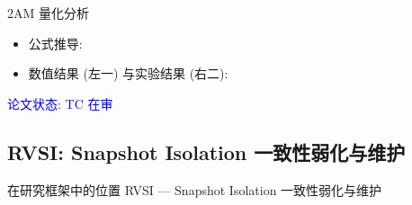 \begin{frame}{2AM 量化分析}
  \begin{itemize}
    \item 公式推导:
      \begin{figure}[h]
        \centering
        \qquad
      \end{figure}
    \item 数值结果 (左一) 与实验结果 (右二): \begin{figure}[h]
        \centering
        \quad
      \end{figure}
  \end{itemize}
  \begin{center}
    \textcolor{blue}{论文状态: TC 在审}
  \end{center}
\end{frame}
\subsection{RVSI: Snapshot Isolation 一致性弱化与维护}

\begin{frame}{在研究框架中的位置}
  {RVSI --- Snapshot Isolation 一致性弱化与维护}
\end{frame}


